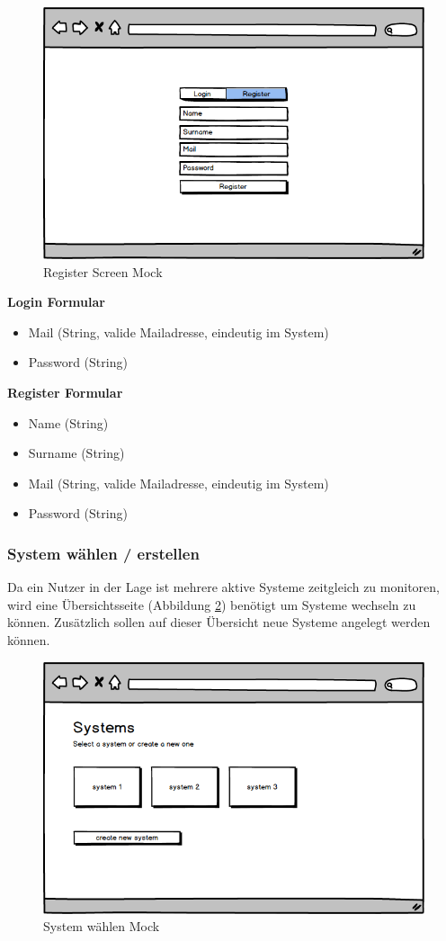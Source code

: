 \begin{figure}[h]
 \centering
 \includegraphics[width=0.7\linewidth]{kapitel1/mocks/Register.png}
 \caption{Register Screen Mock}
  \label{fig:register}
\end{figure}


\textbf{Login Formular}
\begin{itemize}
\item Mail (String, valide Mailadresse, eindeutig im System)
\item Password (String)
\end{itemize}

\textbf{Register Formular}
\begin{itemize}
\item Name (String)
\item Surname (String)
\item Mail (String, valide Mailadresse, eindeutig im System)
\item Password (String)
\end{itemize}



\subsubsection{System wählen / erstellen}

Da ein Nutzer in der Lage ist mehrere aktive Systeme zeitgleich zu monitoren,
wird eine Übersichtsseite (Abbildung \ref{fig:system-picker}) benötigt
um Systeme wechseln zu können. Zusätzlich sollen auf dieser Übersicht
neue Systeme angelegt werden können.

\begin{figure}[h]
 \centering
 \includegraphics[width=0.6\linewidth]{kapitel1/mocks/system-picker.png}
 \caption{System wählen Mock}
 \label{fig:system-picker}
\end{figure}

